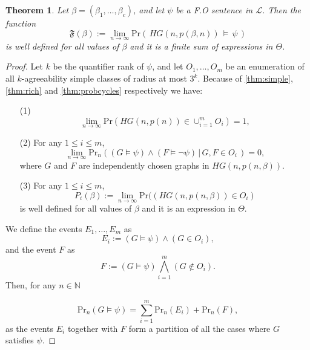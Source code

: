 \documentclass[11pt,notitlepage,a4paper]{article}
\newtheorem{theorem}{Theorem}[section]
\theoremstyle{definition}
\newcommand{\N}{\mathbb{N}}
\newcommand{\Ln}{\lim\limits_{n\to \infty}}
\begin{document}
\begin{theorem} 
	Let $\beta=(\beta_1,\dots, \beta_c)$, and let $\psi$ be a 
	F.O sentence in $\mathcal{L}$. Then the function
	\[
	\mathfrak{F}(\beta):=\Ln \mathrm{Pr}(\, HG(n,p(\beta,n))\, \models \, \psi \,)
	\]
	is well defined for all values of $\beta$ and it is a finite sum 
	of expressions in $\Theta$.
\end{theorem}
\begin{proof}
	Let $k$ be the quantifier rank of $\psi$, and
	let $O_1,\dots,O_m$ be an enumeration of all $k$-agreeability
	simple classes of radius at most $3^k$. Because of \cref{thm:simple},
	\cref{thm:rich} and \cref{thm:probcycles} respectively we have:
	\begin{itemize}
		\item[(1)] 
		\[ \Ln \mathrm{Pr}(HG(n,p(n))\in \cup_{i=1}^m O_i)=1,\]
		\item[(2)] For any $1\leq i \leq m$,
		\[\Ln \mathrm{Pr}_n((G\models \psi) \wedge
		 (F\models \neg \psi) \, | \, G,F\in O_i\,) = 0, \]
		 where $G$ and $F$ are independently chosen graphs in $HG(n,p(n,\beta))$.
		\item[(3)] For any $1\leq i \leq m$,
		\[ P_i(\beta):= \Ln \mathrm{Pr}((HG(n,p(n,\beta)) \in O_i)\]
		is well defined for all values of $\beta$ and it is an expression
		in $\Theta$.
	\end{itemize} 
 We define the events $E_1,\dots,E_{m}$ as
\[E_i:= (G \models \psi) \wedge (G \in O_i),\]
and the  event $F$ as
\[F:= (G \models \psi) \bigwedge_{i=1}^{m} (G \notin O_i).\]
Then, for any $n\in \N$

\begin{equation} \label{eqn:sumevents}
\mathrm{Pr}_n(G\models \psi) = \sum_{i=1}^{m} \mathrm{Pr}_n(E_i)  + \mathrm{Pr}_n(F),
\end{equation}
as the events $E_i$ together with $F$ form a partition of all the cases where $G$ satisfies $\psi$. \par


\end{proof}
\end{document}
